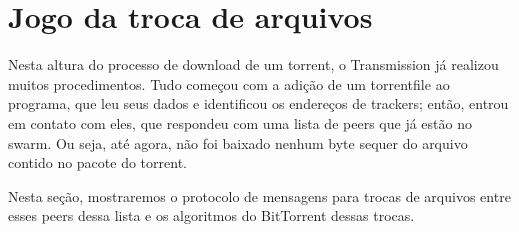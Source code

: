 
\newpage
\section{Jogo da troca de arquivos}
\label{sec:titfortat}

Nesta altura do processo de download de um \gls*{torrent}, o Transmission já realizou
muitos procedimentos. Tudo começou com a adição de um \gls*{torrentfile} ao programa,
que leu seus dados e identificou os endereços de \glspl*{tracker}; então, entrou em
contato com eles, que respondeu com uma lista de \glspl*{peer} que já estão no
\gls*{swarm}. Ou seja, até agora, não foi baixado nenhum byte sequer do arquivo contido
no pacote do \gls*{torrent}.

Nesta seção, mostraremos o protocolo de mensagens para trocas de arquivos entre esses
\glspl*{peer} dessa lista e os algoritmos do BitTorrent dessas trocas.







